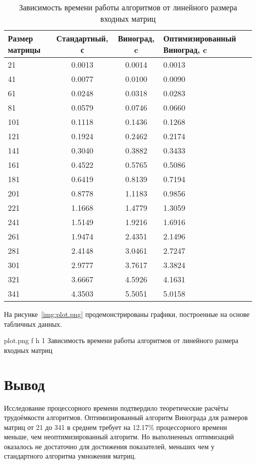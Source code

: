 \begin{table}[h!]
\centering
\caption{Зависимость времени работы алгоритмов от линейного размера входных матриц}
\begin{tabular}{|m{3cm}|c|c|m{5cm}|}
\hline
\textbf{Размер матрицы} & \textbf{Стандартный, с} & \textbf{Виноград, c} & \textbf{Оптимизированный Виноград, c} \\ \hline
21  & 0.0013 & 0.0014 & 0.0013 \\ \hline
41  & 0.0077 & 0.0100 & 0.0090 \\ \hline
61  & 0.0248 & 0.0318 & 0.0283 \\ \hline
81  & 0.0579 & 0.0746 & 0.0660 \\ \hline
101 & 0.1118 & 0.1436 & 0.1268 \\ \hline
121 & 0.1924 & 0.2462 & 0.2174 \\ \hline
141 & 0.3040 & 0.3882 & 0.3433 \\ \hline
161 & 0.4522 & 0.5765 & 0.5086 \\ \hline
181 & 0.6419 & 0.8139 & 0.7194 \\ \hline
201 & 0.8778 & 1.1183 & 0.9856 \\ \hline
221 & 1.1668 & 1.4779 & 1.3059 \\ \hline
241 & 1.5149 & 1.9216 & 1.6916 \\ \hline
261 & 1.9474 & 2.4351 & 2.1496 \\ \hline
281 & 2.4148 & 3.0461 & 2.7247 \\ \hline
301 & 2.9777 & 3.7617 & 3.3824 \\ \hline
321 & 3.6667 & 4.5926 & 4.1631 \\ \hline
341 & 4.3503 & 5.5051 & 5.0158 \\ \hline
\end{tabular}
\label{tab:comparison}
\end{table}

\clearpage

На рисунке~\ref{img:plot.png} продемонстрированы графики, построенные на основе табличных данных.

{plot.png}
{f}
{h}
{1 \textwidth} 
{Зависимость времени работы алгоритмов от линейного размера входных матриц} 

\section*{Вывод}

Исследование процессорного времени подтвердило теоретические расчёты трудоёмкости алгоритмов. Оптимизированный алгоритм Винограда для размеров матриц от 21 до 341 в среднем требует на 12.17\% процессорного времени меньше, чем неоптимизированный алгоритм. Но выполненных оптимизаций оказалось не достаточно для достижения показателей, меньших чем у стандартного алгоритма умножения матриц.

